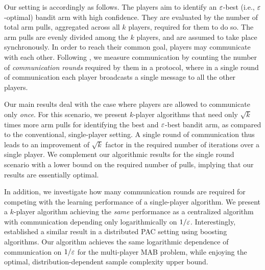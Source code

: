 Our setting is accordingly as follows.
The players aim to identify an $\varepsilon$-best (i.e., $\varepsilon$-optimal) bandit arm with high confidence.
They are evaluated by the number of total arm pulls, aggregated across all $k$ players, required for them to do so. The arm pulls are evenly divided among the $k$ players, and are assumed to take place synchronously. 
In order to reach their common goal, players may communicate with each other. Following \citet{balcan12}, we measure communication by counting the number of {\em communication rounds} required by them in a protocol, where in a single round of communication each player broadcasts a single message to all the other players.

Our main results deal with the case where players are allowed to communicate only \emph{once}.
For this scenario, we present $k$-player algorithms that need only $\sqrt{k}$ times more arm pulls for identifying the best and $\varepsilon$-best bandit arm, as compared to the conventional, single-player setting.
A single round of communication thus leads to an improvement of $\sqrt{k}$ factor in the required number of iterations over a single player. 
We complement our algorithmic results for the single round scenario with a lower bound on the required number of pulls, implying that our results are essentially optimal. 

In addition, we investigate how many communication rounds are required for competing with the learning performance of a single-player algorithm.
We present a $k$-player algorithm achieving the \emph{same} performance as a centralized algorithm with communication depending only logarithmically on $1/\varepsilon$.
Interestingly, \citet{balcan12} established a similar result in a distributed PAC setting using boosting algorithms. Our algorithm achieves the same logarithmic dependence of communication on $1/\varepsilon$ for the multi-player MAB problem, while enjoying the optimal, distribution-dependent sample complexity upper bound.


